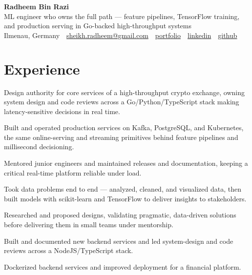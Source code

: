 \documentclass[11pt,a4paper]{resume}
\makeatletter
\newcommand{\Portfolio}{https://radheem.github.io/my-cv}
\newcommand{\PortfolioText}{portfolio}
\newcommand{\GitHub}{https://github.com/radheem}
\newcommand{\LinkedIn}{https://www.linkedin.com/in/radheem-razi}
\newcommand{\Email}{sheikh.radheem@gmail.com}
\makeatother
\begin{document}
\begin{center}
  {\huge\bfseries Radheem Bin Razi}\\[3pt]
  {\large ML engineer who owns the full path — feature pipelines, TensorFlow training, and production serving in Go-backed high-throughput systems}\\[6pt]
  \small
  Ilmenau, Germany \,\textbar\,
  \href{mailto:\Email}{\Email} \,\textbar\,
  \href{\Portfolio}{\PortfolioText} \,\textbar\,
  \href{\LinkedIn}{linkedin} \,\textbar\,
  \href{\GitHub}{github}
\end{center}
\vspace{2pt}

\section{Experience}

\bullets
  \item Design authority for core services of a high-throughput crypto exchange, owning system design and code reviews across a Go/Python/TypeScript stack making latency-sensitive decisions in real time.
  \item Built and operated production services on Kafka, PostgreSQL, and Kubernetes, the same online-serving and streaming primitives behind feature pipelines and millisecond decisioning.
  \item Mentored junior engineers and maintained releases and documentation, keeping a critical real-time platform reliable under load.
\bulletsend
\vspace{3pt}
\bullets
  \item Took data problems end to end — analyzed, cleaned, and visualized data, then built models with scikit-learn and TensorFlow to deliver insights to stakeholders.
  \item Researched and proposed designs, validating pragmatic, data-driven solutions before delivering them in small teams under mentorship.
\bulletsend
\vspace{3pt}
\bullets
  \item Built and documented new backend services and led system-design and code reviews across a NodeJS/TypeScript stack.
  \item Dockerized backend services and improved deployment for a financial platform.
\bulletsend
\vspace{3pt}
\end{document}
